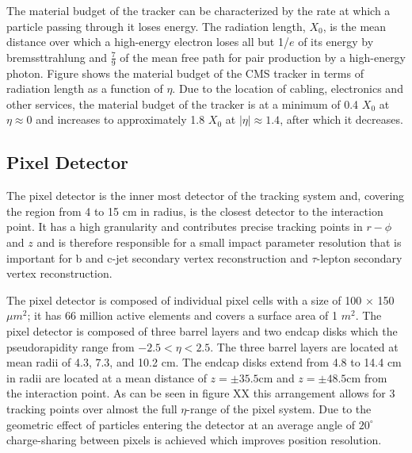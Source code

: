 The material budget of the tracker can be characterized by the rate at which a particle
passing through it loses energy. The radiation length, $X_{0}$, is the 
mean distance over which a high-energy electron loses all but 1/$e$ of its energy by bremssttrahlung %
and $\frac{7}{9}$ of the mean free path for pair production by a high-energy photon. Figure %
shows the material budget of the CMS tracker in terms of radiation length as a function of $\eta$. 
Due to the location of cabling, electronics and other services, the material budget of the 
tracker is at a minimum of 0.4 $X_{0}$ at $\eta \approx 0$ and increases to approximately 1.8 $X_{0}$
at $|\eta| \approx 1.4$, after which it decreases. 

\subsection{Pixel Detector}%
The pixel detector is the inner most detector of the tracking system and, %
covering the region from 4 to 15 cm in radius, is the closest detector to 
the interaction point. It has a high granularity and contributes precise 
tracking points in $r-\phi$ and $z$ and is therefore responsible for a small impact 
parameter resolution that is important for b and c-jet secondary
vertex reconstruction and $\tau$-lepton secondary vertex reconstruction.

The pixel detector is composed of individual pixel cells with a size of 
100 $\times$ 150 $\mu m^{2}$; it has 66 million active elements and covers
a surface area of 1 $m^{2}$. The pixel detector is composed of three barrel 
layers and two endcap disks which the pseudorapidity range from $-2.5<\eta<2.5$.
The three barrel layers are located at mean radii of 4.3, 7.3, and 10.2 cm. 
The endcap disks extend from 4.8 to 14.4 cm in radii are located at a mean distance
of $z=\pm35.5$cm and $z=\pm48.5$cm from the interaction point. 
As can be seen in figure XX this arrangement allows for 3 tracking points over %
almost the full $\eta$-range of the pixel system. Due to the geometric effect 
of particles entering the detector at an average angle of $20^{\circ}$ %
charge-sharing between pixels is achieved which improves position resolution.

